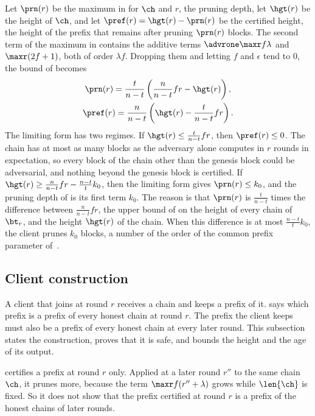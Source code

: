 Let $\prn(r)$ be the maximum in  for $\ch$ and $r$, the
pruning depth, let $\hgt(r)$ be the height of $\ch$, and let
$\pref(r)=\hgt(r)-\prn(r)$ be the certified height, the height of the prefix
that remains after pruning $\prn(r)$ blocks. The
second term of the maximum in  contains the additive terms
$\advrone\maxr f\lambda$ and $\maxr(2f+1)$, both of order $\lambda f$. Dropping
them and letting $f$ and $\epsilon$ tend to $0$, the bound of 
becomes
\begin{gather*}
    \prn(r) = \frac{t}{n-t}\left(\frac{n}{n-t}fr-\hgt(r)\right),\\
    \pref(r) = \frac{n}{n-t}\left(\hgt(r)-\frac{t}{n-t}fr\right) .
\end{gather*}
The limiting form has two regimes. If $\hgt(r)\le\frac{t}{n-t}fr$, then
$\pref(r)\le0$. The chain has at most as many blocks as the adversary alone
computes in $r$ rounds in expectation, so every block of the chain other than
the genesis block could be adversarial, and nothing beyond the genesis block
is certified. If $\hgt(r)\ge\frac{n}{n-t}fr-\frac{n-t}{t}k_0$, then the
limiting form gives $\prn(r)\le k_0$, and the pruning depth of
 is its first term $k_0$. The reason is that $\prn(r)$ is
$\frac{t}{n-t}$ times the difference between $\frac{n}{n-t}fr$, the upper
bound of  on the height of every chain of $\bt_r$, and the
height $\hgt(r)$ of the chain. When this difference is at most
$\frac{n-t}{t}k_0$, the client prunes $k_0$ blocks, a number of the order of
the common prefix parameter of~\cite{gkl24}.

\subsection{Client construction}
\label{sec.client}

A client that joins at round $r$ receives a chain and keeps a prefix of it.
 says which prefix is a prefix of every honest chain at round
$r$. The prefix the client keeps must also be a prefix of every honest chain at
every later round. This subsection states the construction, proves that it is
safe, and bounds the height and the age of its output.

 certifies a prefix at round $r$ only. Applied at a later
round $r''$ to the same chain $\ch$, it prunes more, because the term
$\maxr f(r''+\lambda)$ grows while $\len{\ch}$ is fixed. So it does not show
that the prefix certified at round $r$ is a prefix of the honest chains of
later rounds.

